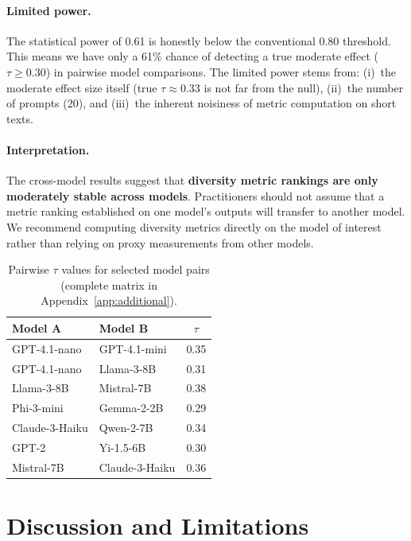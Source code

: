 \documentclass[11pt,a4paper]{article}
\begin{document}
\paragraph{Limited power.}
The statistical power of 0.61 is honestly below the
conventional 0.80 threshold.  This means we have only
a 61\% chance of detecting a true moderate effect
($\tau \geq 0.30$) in pairwise model comparisons.
The limited power stems from:
(i)~the moderate effect size itself (true $\tau \approx
0.33$ is not far from the null),
(ii)~the number of prompts (20), and
(iii)~the inherent noisiness of metric computation on
short texts.

\paragraph{Interpretation.}
The cross-model results suggest that \textbf{diversity
metric rankings are only moderately stable across models}.
Practitioners should not assume that a metric ranking
established on one model's outputs will transfer to
another model.  We recommend computing diversity metrics
directly on the model of interest rather than relying on
proxy measurements from other models.

\begin{table}[t]
\centering
\caption{Pairwise $\tau$ values for selected model
pairs (complete matrix in Appendix~\ref{app:additional}).}
\label{tab:pairwise_tau}
\begin{tabular}{@{}llc@{}}
\toprule
Model A & Model B & $\tau$ \\
\midrule
GPT-4.1-nano & GPT-4.1-mini & 0.35 \\
GPT-4.1-nano & Llama-3-8B   & 0.31 \\
Llama-3-8B   & Mistral-7B   & 0.38 \\
Phi-3-mini   & Gemma-2-2B   & 0.29 \\
Claude-3-Haiku & Qwen-2-7B  & 0.34 \\
GPT-2        & Yi-1.5-6B    & 0.30 \\
Mistral-7B   & Claude-3-Haiku & 0.36 \\
\bottomrule
\end{tabular}
\end{table}

\section{Discussion and Limitations}\label{sec:discussion}
\end{document}
